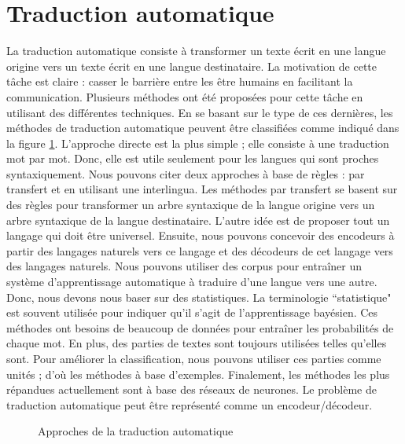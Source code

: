 \documentclass{KodeBook}
\begin{document}
\section{Traduction automatique}

La traduction automatique consiste à transformer un texte écrit en une langue origine vers un texte écrit en une langue destinataire.
La motivation de cette tâche est claire : casser le barrière entre les être humains en facilitant la communication. 
Plusieurs méthodes ont été proposées pour cette tâche en utilisant des différentes techniques. 
En se basant sur le type de ces dernières, les méthodes de traduction automatique peuvent être classifiées comme indiqué dans la figure \ref{fig:mt-class}. 
L'approche directe est la plus simple ; elle consiste à une traduction mot par mot. 
Donc, elle est utile seulement pour les langues qui sont proches syntaxiquement.
Nous pouvons citer deux approches à base de règles : par transfert et en utilisant une interlingua.
Les méthodes par transfert se basent sur des règles pour transformer un arbre syntaxique de la langue origine vers un arbre syntaxique de la langue destinataire. 
L'autre idée est de proposer tout un langage qui doit être universel.
Ensuite, nous pouvons concevoir des encodeurs à partir des langages naturels vers ce langage et des décodeurs de cet langage vers des langages naturels.
Nous pouvons utiliser des corpus pour entraîner un système d'apprentissage automatique à traduire d'une langue vers une autre. 
Donc, nous devons nous baser sur des statistiques. 
La terminologie ``statistique" est souvent utilisée pour indiquer qu'il s'agit de l'apprentissage bayésien. 
Ces méthodes ont besoins de beaucoup de données pour entraîner les probabilités de chaque mot. 
En plus, des parties de textes sont toujours utilisées telles qu'elles sont. 
Pour améliorer la classification, nous pouvons utiliser ces parties comme unités ; d'où les méthodes à base d'exemples.
Finalement, les méthodes les plus répandues actuellement sont à base des réseaux de neurones. 
Le problème de traduction automatique peut être représenté comme un encodeur/décodeur.

\begin{figure}[!ht]
	\centering
	\caption{Approches de la traduction automatique}
	\label{fig:mt-class}
\end{figure}
\end{document}
